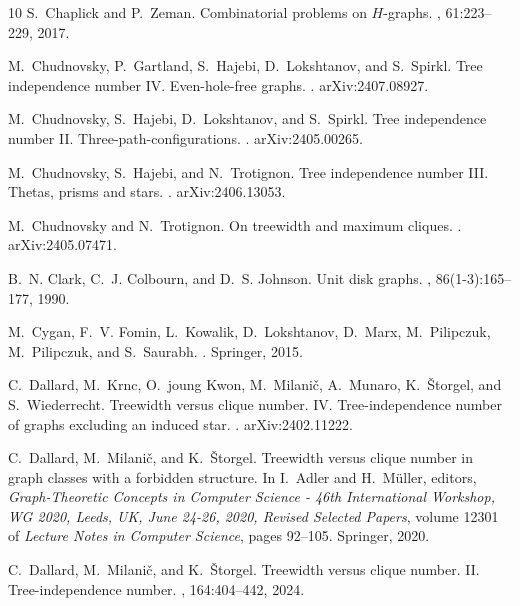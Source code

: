 \documentclass[11pt]{article}
\theoremstyle{definition}
\begin{document}
\begin{thebibliography}{10}
S.~Chaplick and P.~Zeman.
\newblock Combinatorial problems on {$H$}-graphs.
, 61:223--229, 2017.

M.~Chudnovsky, P.~Gartland, S.~Hajebi, D.~Lokshtanov, and S.~Spirkl.
\newblock Tree independence number {IV. E}ven-hole-free graphs.
.
\newblock arXiv:2407.08927.

M.~Chudnovsky, S.~Hajebi, D.~Lokshtanov, and S.~Spirkl.
\newblock Tree independence number {II. T}hree-path-configurations.
.
\newblock arXiv:2405.00265.

M.~Chudnovsky, S.~Hajebi, and N.~Trotignon.
\newblock Tree independence number {III. T}hetas, prisms and stars.
.
\newblock arXiv:2406.13053.

M.~Chudnovsky and N.~Trotignon.
\newblock On treewidth and maximum cliques.
.
\newblock arXiv:2405.07471.

B.~N. Clark, C.~J. Colbourn, and D.~S. Johnson.
\newblock Unit disk graphs.
, 86(1-3):165--177, 1990.

M.~Cygan, F.~V. Fomin, L.~Kowalik, D.~Lokshtanov, D.~Marx, M.~Pilipczuk,
  M.~Pilipczuk, and S.~Saurabh.
.
\newblock Springer, 2015.

C.~Dallard, M.~Krnc, O.~joung Kwon, M.~Milanič, A.~Munaro, K.~Štorgel, and
  S.~Wiederrecht.
\newblock Treewidth versus clique number. {IV. T}ree-independence number of
  graphs excluding an induced star.
.
\newblock arXiv:2402.11222.

C.~Dallard, M.~Milani{\v{c}}, and K.~{\v{S}}torgel.
\newblock Treewidth versus clique number in graph classes with a forbidden
  structure.
\newblock In I.~Adler and H.~M{\"{u}}ller, editors, {\em Graph-Theoretic
  Concepts in Computer Science - 46th International Workshop, {WG} 2020, Leeds,
  UK, June 24-26, 2020, Revised Selected Papers}, volume 12301 of {\em Lecture
  Notes in Computer Science}, pages 92--105. Springer, 2020.

C.~Dallard, M.~Milani{\v c}, and K.~{\v S}torgel.
\newblock Treewidth versus clique number. {II. T}ree-independence number.
, 164:404--442, 2024.


\end{thebibliography}
\end{document}
